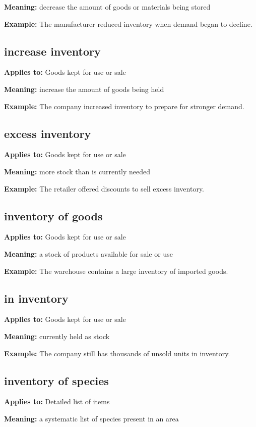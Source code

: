 \documentclass[11pt]{article}
\begin{document}
\textbf{Meaning:} decrease the amount of goods or materials being stored

\textbf{Example:} The manufacturer reduced inventory when demand began to decline.

\subsection{increase inventory}
\textbf{Applies to:} Goods kept for use or sale

\textbf{Meaning:} increase the amount of goods being held

\textbf{Example:} The company increased inventory to prepare for stronger demand.

\subsection{excess inventory}
\textbf{Applies to:} Goods kept for use or sale

\textbf{Meaning:} more stock than is currently needed

\textbf{Example:} The retailer offered discounts to sell excess inventory.

\subsection{inventory of goods}
\textbf{Applies to:} Goods kept for use or sale

\textbf{Meaning:} a stock of products available for sale or use

\textbf{Example:} The warehouse contains a large inventory of imported goods.

\subsection{in inventory}
\textbf{Applies to:} Goods kept for use or sale

\textbf{Meaning:} currently held as stock

\textbf{Example:} The company still has thousands of unsold units in inventory.

\subsection{inventory of species}
\textbf{Applies to:} Detailed list of items

\textbf{Meaning:} a systematic list of species present in an area
\end{document}
